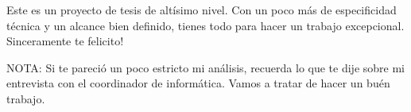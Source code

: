 \documentclass[12pt,a4paper]{article}
\begin{document}
Este es un proyecto de tesis de altísimo nivel. Con un poco más de especificidad técnica y un alcance 
bien definido, tienes todo para hacer un trabajo excepcional. 
Sinceramente te felicito!

NOTA: Si te pareció un poco estricto mi análisis, recuerda lo que te dije sobre mi entrevista 
con el coordinador de informática. Vamos a tratar de hacer un buén trabajo.
\end{document}

